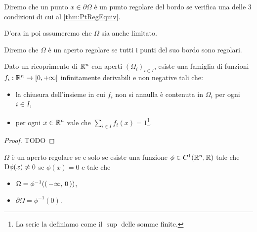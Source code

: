 \begin{definition}
	Diremo che un punto $x\in \partial \Omega$ è un punto regolare del bordo se verifica una delle $3$ condizioni di cui
	al \cref{thm:PtRegEquiv}.
\end{definition}

D'ora in poi assumeremo che $\Omega$ sia anche limitato.

\begin{definition}
	Diremo che $\Omega$ è un aperto regolare se tutti i punti del suo bordo sono regolari.
\end{definition}


\begin{theorem}\label{thm:PartizioneUnita}
	Dato un ricoprimento di $\mathbb R^n$ con aperti $(\Omega_i)_{i\in I}$, esiste una famiglia di funzioni $f_i:\mathbb R^n\to[0,+\infty]$ infinitamente derivabili
	e non negative tali che:
	\begin{itemize}
		\item la chiusura dell'insieme in cui $f_i$ non si annulla è contenuta in $\Omega_i$ per ogni $i\in I$,
		\item per ogni $x\in\mathbb R^n$ vale che $\sum_{i\in I} f_i(x)=1$\footnote{La serie la definiamo come il $\sup$ delle somme finite.}.
	\end{itemize}
\end{theorem}
\begin{proof}
	TODO
\end{proof}

\begin{lemma}\label{lem:EquivRegolare}
	$\Omega$ è un aperto regolare se e solo se esiste una funzione $\phi\in C^1(\mathbb R^n,\mathbb R)$ tale che $\mathrm D \phi(x)\neq 0$ se $\phi(x)=0$ e tale che
	\begin{itemize}
		\item $\Omega = \phi^{-1}(\left(\,-\infty,\,0\,\right))$,
		\item $\partial \Omega = \phi^{-1}(0)$.
	\end{itemize}
\end{lemma}

